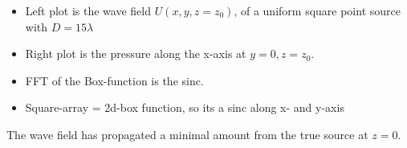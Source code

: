 \documentclass[compress]{beamer}
\begin{document}
\begin{frame}
\begin{columns}
\begin{column}{0.5\textwidth}
\begin{figure}
            \end{figure}
        \end{column}
    \end{columns}
    \begin{itemize}
        \item Left plot is the wave field $U(x,y,z=z_0)$, of a uniform square point source with $D=15\lambda$
        \item Right plot is the pressure along the x-axis at $y = 0, z=z_0$.
        \item FFT of the Box-function is the sinc.
        \item Square-array = 2d-box function, so its a sinc along x- and y-axis
    \end{itemize}
    The wave field has propagated a minimal amount from the true source at $z=0$.
\end{frame} %
\end{document}
